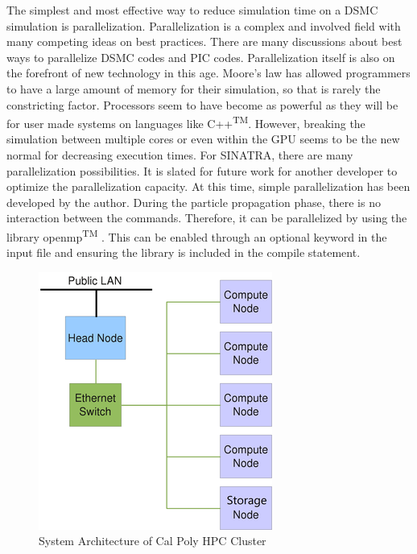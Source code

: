 \indent The simplest and most effective way to reduce simulation time on a DSMC simulation is parallelization. Parallelization is a complex and involved field with many competing ideas on best practices. There are many discussions about best ways to parallelize DSMC codes and PIC codes. Parallelization itself is also on the forefront of new technology in this age. Moore's law has allowed programmers to have a large amount of memory for their simulation, so that is rarely the constricting factor. Processors seem to have become as powerful as they will be for user made systems on languages like C++\textsuperscript{TM}. However, breaking the simulation between multiple cores or even within the GPU seems to be the new normal for decreasing execution times. For SINATRA, there are many parallelization possibilities. It is slated for future work for another developer to optimize the parallelization capacity. At this time, simple parallelization has been developed by the author. During the particle propagation phase, there is no interaction between the commands. Therefore, it can be parallelized by using the library openmp\textsuperscript{TM} \cite{openmp}. This can be enabled through an optional keyword in the input file and ensuring the library is included in the compile statement. \par

\begin{figure}
\includegraphics[width=.65\textwidth]{figures/HPC_cluster.png}
\centering
\caption{System Architecture of Cal Poly HPC Cluster\cite{hpc}}
\label{fig:hpccluser}
\end{figure}

